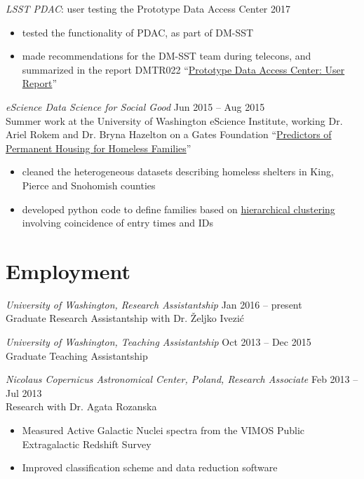 \documentclass[margin]{res}
\begin{document}
\begin{resume}
{\sl LSST PDAC}: user testing the Prototype Data Access Center \hfill            2017\\
\begin{itemize}  \itemsep -1pt 
\item tested the functionality of PDAC, as part of DM-SST
\item made recommendations for the DM-SST team during telecons, and summarized in the report DMTR022 ``\href{https://ls.st/DMTR-22}{Prototype Data Access Center: User Report}'' 
\end{itemize}



{\sl eScience Data Science for Social Good} \hfill Jun 2015 -- Aug 2015\\
 Summer work at the University of Washington eScience Institute, working Dr. Ariel Rokem and Dr. Bryna Hazelton  on a Gates Foundation  ``\href{https://escience.washington.edu/get-involved/data-science-for-social-good/dssg-project-summaries-15}{Predictors of Permanent Housing for Homeless Families}''
\begin{itemize}  \itemsep -1pt 
\item cleaned the heterogeneous datasets describing homeless shelters in King, Pierce and Snohomish counties
\item developed python code to define families based on \href{https://uwescience.github.io/DSSG2015-predicting-permanent-housing/2015-07-27-chris-galaxy-clusters/}{hierarchical clustering} involving coincidence of entry times and IDs 
\end{itemize}



\section{Employment} 

{\sl University of Washington, Research Assistantship} \hfill           Jan 2016 -- present\\ Graduate Research Assistantship with Dr. \v{Z}eljko Ivezi\'c 


{\sl University of Washington, Teaching Assistantship} \hfill           Oct 2013 -- Dec 2015 \\ Graduate Teaching Assistantship


{\sl Nicolaus Copernicus Astronomical Center, Poland, Research Associate} \hfill Feb 2013 -- Jul 2013 \\ Research with Dr. Agata Rozanska
\begin{itemize}
	\item Measured Active Galactic Nuclei spectra from the VIMOS Public Extragalactic Redshift Survey
	\item Improved classification scheme and data reduction software
\end{itemize}



\end{resume}
\end{document}
